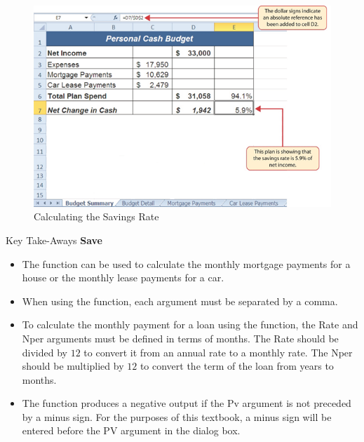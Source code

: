 \begin{figure}[H]
	\centering
	\includegraphics[width=\maxwidth{.95\linewidth}]{gfx/ch02_fig39}
	\caption{Calculating the Savings Rate}
	\label{02:fig39}
\end{figure}

\begin{center}
	\begin{tkwbox}{Key Take-Aways}
		\textbf{Save}
		\\
		\begin{itemize}
			\setlength{\itemsep}{0pt}
			\setlength{\parskip}{0pt}
			\setlength{\parsep}{0pt}
			
			\item The  function can be used to calculate the monthly mortgage payments for a house or the monthly lease payments for a car.
			\item When using the  function, each argument must be separated by a comma.
			\item To calculate the monthly payment for a loan using the  function, the Rate and Nper arguments must be defined in terms of months. The Rate should be divided by $ 12 $ to convert it from an annual rate to a monthly rate. The Nper should be multiplied by $ 12 $ to convert the term of the loan from years to months.
			\item The  function produces a negative output if the Pv argument is not preceded by a minus sign. For the purposes of this textbook, a minus sign will be entered before the PV argument in the  dialog box.
			
		\end{itemize}
	\end{tkwbox}
\end{center}

